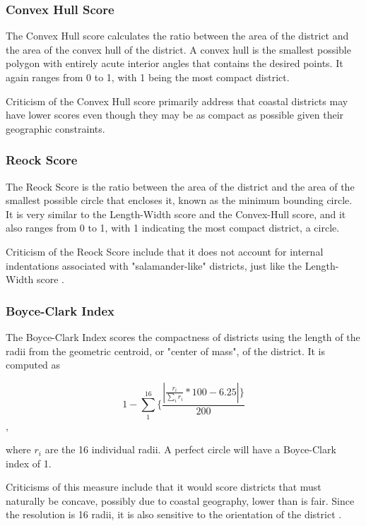 \subsubsection{Convex Hull Score}

The Convex Hull score calculates the ratio between the area of the district and the area of the convex hull of the district. A convex hull is the smallest possible polygon with entirely acute interior angles that contains the desired points. It again ranges from 0 to 1, with 1 being the most compact district. \parencite{maceachren1985}

Criticism of the Convex Hull score primarily address that coastal districts may have lower scores even though they may be as compact as possible given their geographic constraints.

\subsubsection{Reock Score}

The Reock Score is the ratio between the area of the district and the area of the smallest possible circle that encloses it, known as the minimum bounding circle. It is very similar to the Length-Width score and the Convex-Hull score, and it also ranges from 0 to 1, with 1 indicating the most compact district, a circle. \parencite{reock1961}

Criticism of the Reock Score include that it does not account for internal indentations associated with "salamander-like" districts, just like the Length-Width score \parencite{maceachren1985}. 

\subsubsection{Boyce-Clark Index}

The Boyce-Clark Index scores the compactness of districts using the length of the radii from the geometric centroid, or "center of mass", of the district. It is computed as 

\begin{equation}
    1 - \sum_{1}^{16}\{\frac{|\frac{r_i}{\sum_ir_i}*100-6.25 |\}}{200}
\end{equation},

where $r_i$ are the 16 individual radii. A perfect circle will have a Boyce-Clark index of 1. \parencite{boyce1964,fifield2020d}

Criticisms of this measure include that it would score districts that must naturally be concave, possibly due to coastal geography, lower than is fair. Since the resolution is 16 radii, it is also sensitive to the orientation of the district \parencite{boyce1964}.

